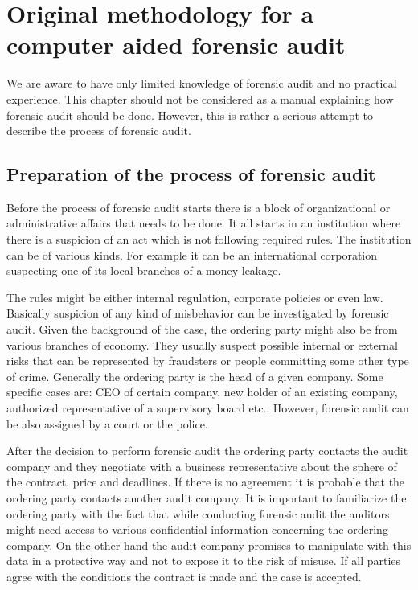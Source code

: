 \chapter{Original methodology for a computer aided forensic audit}
%
%
%


We are aware to have only limited knowledge of forensic audit and no practical experience. This chapter should not be considered as a manual explaining how forensic audit should be done.  However, this is rather a serious attempt to describe the process of forensic audit.


\section{Preparation of the process of forensic audit}
Before the process of forensic audit starts there is a block of organizational or administrative affairs that needs to be done. It all starts in an institution where there is a suspicion of an act which is not following required rules. The institution can be of various kinds. For example it can be an international corporation suspecting one of its local branches of a money leakage. %

The rules might be either internal regulation, corporate policies or even law. Basically suspicion of any kind of misbehavior can be investigated by forensic audit. Given the background of the case, the ordering party might also be from various branches of economy. They usually suspect possible internal or external risks that can be represented by fraudsters or people committing some other type of crime.  Generally the ordering party is the head of a given company. Some specific cases are: CEO of certain company, new holder of an existing company, authorized representative of a supervisory board etc.. However, forensic audit can be also assigned by a court or the police. 

After the decision to perform forensic audit the ordering party contacts the audit company and they negotiate with a business representative about the sphere of the contract, price and deadlines. If there is no agreement it is probable that the ordering party contacts another audit company. It is important to familiarize the ordering party with the fact that while conducting forensic audit the auditors might need access to various confidential information concerning the ordering company. On the other hand the audit company promises to manipulate with this data in a protective way and not to expose it to the risk of misuse. If all parties agree with the conditions the contract is made and the case is accepted. 

